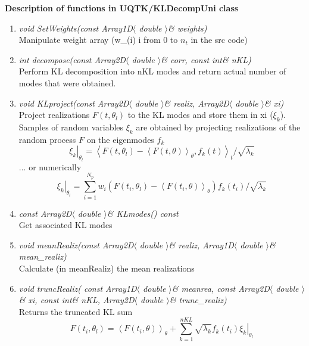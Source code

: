 \documentclass[paper = letter, fontsize = 11pt]{scrartcl} %
\begin{document}
\textbf{Description of functions in UQTK/KLDecompUni class}
\begin{enumerate}
\item \textit{void SetWeights(const Array1D$\langle$ double $\rangle$\& weights)}\\

Manipulate weight array (w\_(i) i from 0 to $n_t$ in the src code)

\item \textit{int decompose(const Array2D$\langle$ double $\rangle$\& corr, const int\& nKL)}\\

Perform KL decomposition into nKL modes and return actual number of modes that were obtained.

\item \textit{void KLproject(const Array2D$\langle$ double $\rangle$\& realiz, Array2D$\langle$ double $\rangle$\& xi)}\\

Project realizations $F(t,\theta_l)$ to the KL modes and store them in xi ($\xi_k$). Samples of random variables $\xi_k$ are obtained by projecting
  realizations of the random process $F$ on the eigenmodes $f_k$
   \[\left.\xi_k\right\vert_{\theta_l}=\left <F(t,\theta_l)-\left <
    F(t,\theta) \right >_{\theta}, f_k(t) \right >_t/\sqrt{\lambda_k} \]
  ... or numerically
  \[
  \left.\xi_k\right\vert_{\theta_l}=\sum_{i=1}^{N_p} w_i\left(F(t_i,\theta_l)-\left <
    F(t_i,\theta) \right >_{\theta} \right) f_k(t_i)/\sqrt{\lambda_k} \]

\item \textit{const Array2D$\langle$ double $\rangle$\& KLmodes() const}\\

Get associated KL modes

\item \textit{void meanRealiz(const Array2D$\langle$ double $\rangle$\& realiz, Array1D$\langle$ double $\rangle$\& mean\_realiz)}\\ 

Calculate (in meanRealiz) the mean realizations   

\item \textit{ void truncRealiz( const Array1D$\langle$ double $\rangle$\& meanrea, const Array2D$\langle$ double $\rangle$\& xi, const int\& nKL, Array2D$\langle$ double $\rangle$\& trunc\_realiz)}\\

Returns the truncated KL sum
 \[ 
    F(t_i,\theta_l) = \left < F(t_i,\theta) \right >_{\theta} 
                          + \sum_{k=1}^{nKL} \sqrt{\lambda_k} f_k(t_i) \left. \xi_k\right\vert_{\theta_l}
\] 


\end{enumerate} 
\end{document}

